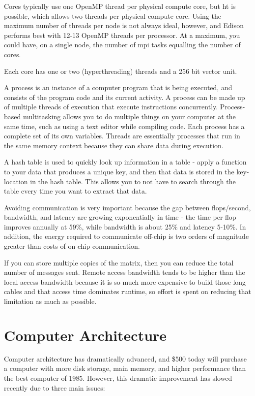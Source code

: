\documentclass[10pt]{article}
\begin{document}
\begin{flushleft}
Cores typically use one OpenMP thread per physical compute core, but \gls{ht} is possible, which allows two threads per physical compute core.   Using the maximum number of threads per node is not always ideal, however, and Edison performs best with 12-13 OpenMP threads per processor. At a maximum, you could have, on a single node, the number of \gls{mpi} tasks equalling the number of cores.

Each core has one or two (hyperthreading) threads and a 256 bit vector unit. 

A process is an instance of a computer program that is being executed, and consists of the program code and its current activity. A process can be made up of multiple threads of execution that execute instructions concurrently. Process-based multitasking allows you to do multiple things on your computer at the same time, such as using a text editor while compiling code. Each process has a complete set of its own variables. Threads are essentially processes that run in the same memory context because they can share data during execution. 

A hash table is used to quickly look up information in a table - apply a function to your data that produces a unique key, and then that data is stored in the key-location in the hash table. This allows you to not have to search through the table every time you want to extract that data. 

Avoiding communication is very important because the gap between flops/second, bandwidth, and latency are growing exponentially in time - the time per flop improves annually at 59\%, while bandwidth is about 25\% and latency 5-10\%. In addition, the energy required to communicate off-chip is two orders of magnitude greater than costs of on-chip communication. 

If you can store multiple copies of the matrix, then you can reduce the total number of messages sent. Remote access bandwidth tends to be higher than the local access bandwidth because it is so much more expensive to build those long cables and that access time dominates runtime, so effort is spent on reducing that limitation as much as possible.

\section{Computer Architecture}
Computer architecture has dramatically advanced, and \$500 today will purchase a computer with more disk storage, main memory, and higher performance than the best computer of 1985. However, this dramatic improvement has slowed recently due to three main issues:


\end{flushleft}
\end{document}
